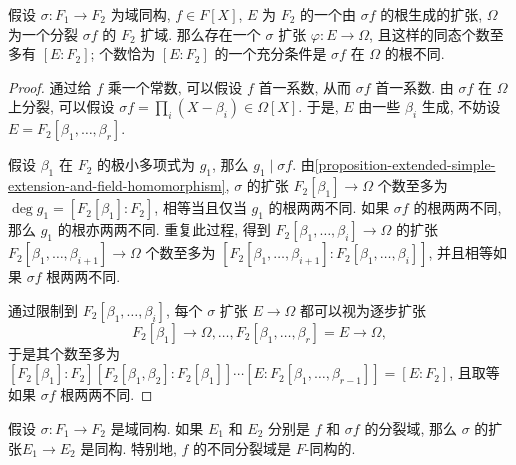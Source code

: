 \begin{proposition}
  \label{proposition-single-polynomial-extension-number}
  假设 \( \sigma: F_1 \to F_2 \) 为域同构, \( f \in F[X] \), \( E \) 为 \( F_2
  \) 的一个由 \( \sigma f \) 的根生成的扩张, \( \Omega \) 为一个分裂 \( \sigma f
  \) 的 \( F_2 \) 扩域.
  那么存在一个 \( \sigma \) 扩张 \( \varphi: E \to \Omega \),
  且这样的同态个数至多有 \( [E: F_2] \);
  个数恰为 \( [E:F_2] \) 的一个充分条件是 \( \sigma f \) 在 \( \Omega \)
  的根不同.
\end{proposition}
\begin{proof}
  通过给 \( f \) 乘一个常数, 可以假设 \( f \) 首一系数, 从而 \( \sigma f \)
  首一系数.
  由 \( \sigma f \) 在 \( \Omega \) 上分裂, 可以假设 \( \sigma f = \prod_i(X -
  \beta_i) \in \Omega[X] \).
  于是, \( E \) 由一些 \( \beta_i \) 生成, 不妨设 \( E = F_2[\beta_1, \ldots,
  \beta_r] \).

  假设 \( \beta_1 \) 在 \( F_2 \) 的极小多项式为 \( g_1 \), 那么 \( g_1 \mid
  \sigma f \).
  由\cref{proposition-extended-simple-extension-and-field-homomorphism}, \(
  \sigma \) 的扩张 \( F_2[\beta_1] \to \Omega \) 个数至多为 \( \deg g_1 =
  [F_2[\beta_1]: F_2] \), 相等当且仅当 \( g_1 \) 的根两两不同.
  如果 \( \sigma f \) 的根两两不同, 那么 \( g_1 \) 的根亦两两不同.
  重复此过程, 得到 \( F_2[\beta_1, \ldots, \beta_i] \to \Omega \) 的扩张 \(
  F_2[\beta_1, \ldots, \beta_{i + 1}] \to \Omega \) 个数至多为 \( [F_2[\beta_1,
  \ldots, \beta_{i + 1}]: F_2[\beta_1, \ldots, \beta_{i}]] \), 并且相等如果 \(
  \sigma f \) 根两两不同.

  通过限制到 \( F_2[\beta_1, \ldots, \beta_{i}] \), 每个 \( \sigma \) 扩张 \( E
  \to \Omega \) 都可以视为逐步扩张
  \[
    F_2[\beta_1] \to \Omega, \ldots, F_2[\beta_1,\ldots ,\beta_r] = E \to
    \Omega,
  \]
  于是其个数至多为 \( [F_2[\beta_1]:F_2] [F_2[\beta_1, \beta_2]:F_2[\beta_1]]
  \cdots [E: F_2[\beta_1,\ldots,\beta_{r - 1}]] = [E:F_2] \), 且取等如果 \(
  \sigma f \) 根两两不同.
\end{proof}

\begin{corollary}
  \label{corollary-splitting-fields-isomorphic}
  假设 \( \sigma: F_1 \to F_2 \) 是域同构.
  如果 \( E_1 \) 和 \( E_2 \) 分别是 \( f \) 和 \( \sigma f \) 的分裂域, 那么 \(
  \sigma \) 的扩张\( E_1 \to E_2 \) 是同构.
  特别地, \( f \) 的不同分裂域是 \( F \)-同构的.
\end{corollary}

